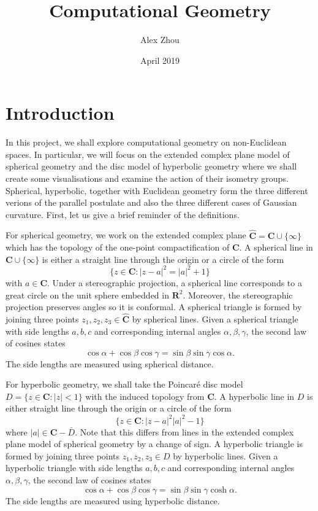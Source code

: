\documentclass{article}
\title{Computational Geometry}
\author{Alex Zhou}
\date{April 2019}
\begin{document}
\maketitle

\section{Introduction}

In this project, we shall explore computational geometry on non-Euclidean spaces. In particular, we will focus on the extended complex plane model of spherical geometry and the disc model of hyperbolic geometry where we shall create some visualisations and examine the action of their isometry groups. Spherical, hyperbolic, together with Euclidean geometry form the three different verions of the parallel postulate and also the three different cases of Gaussian curvature. First, let us give a brief reminder of the definitions.

For spherical geometry, we work on the extended complex plane \(\hat{\mathbf{C}} = \mathbf{C} \cup \{\infty\}\) which has the topology of the one-point compactification of \(\mathbf{C}\). A spherical line in \(\mathbf{C} \cup \{\infty\}\) is either a straight line through the origin or a circle of the form
\[ \{ z \in \mathbf{C} : |z-a|^2 = |a|^2 + 1 \} \]
with \(a \in \mathbf{C}\). Under a stereographic projection, a spherical line corresponds to a great circle on the unit sphere embedded in \(\mathbf{R}^2\). Moreover, the stereographic projection preserves angles so it is conformal. A spherical triangle is formed by joining three points \(z_1, z_2, z_3 \in \hat{\mathbf{C}}\) by spherical lines. Given a spherical triangle with side lengths \(a,b,c\) and corresponding internal angles \(\alpha,\beta,\gamma\), the second law of cosines states
\[ \cos\alpha + \cos\beta\cos\gamma = \sin\beta\sin\gamma\cos\alpha. \]
The side lengths are measured using spherical distance.

For hyperbolic geometry, we shall take the Poincar\'{e} disc model \(D = \{z \in \mathbf{C} : |z| < 1\}\) with the induced topology from \(\mathbf{C}\). A hyperbolic line in \(D\) is either straight line through the origin or a circle of the form
\[ \{z \in \mathbf{C} : |z-a|^2  |a|^2 - 1\} \]
where \(|a| \in \mathbf{C} - \bar{D}\). Note that this differs from lines in the extended complex plane model of spherical geometry by a change of sign. A hyperbolic triangle is formed by joining three points \(z_1, z_2, z_3 \in D\) by hyperbolic lines. Given a hyperbolic triangle with side lengths \(a,b,c\) and corresponding internal angles \(\alpha,\beta,\gamma\), the second law of cosines states
\[ \cos\alpha + \cos\beta\cos\gamma = \sin\beta\sin\gamma\cosh\alpha. \]
The side lengths are measured using hyperbolic distance.
\end{document}
